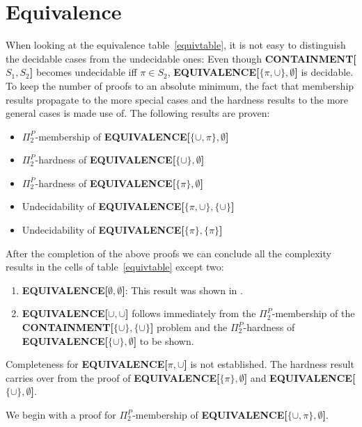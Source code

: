 \section{Equivalence}
When looking at the equivalence table~\ref{equivtable}, it is not easy to
distinguish the decidable cases from the undecidable ones: Even though
\textbf{CONTAINMENT[$S_1,S_2$]} becomes
undecidable iff $\pi \in S_2$, \textbf{EQUIVALENCE[$\{\pi,\cup\},\emptyset$]}
is decidable. To keep the number of proofs to an absolute minimum, the
fact that membership results propagate to the more special cases and the hardness
results to the more general cases is made use of.
The following results are proven:
\begin{itemize}
	\item $\Pi^P_2$-membership of \textbf{EQUIVALENCE[$\{\cup,\pi\},\emptyset$]}
	\item $\Pi^P_2$-hardness of \textbf{EQUIVALENCE[$\{\cup\},\emptyset$]}
	\item $\Pi^P_2$-hardness of \textbf{EQUIVALENCE[$\{\pi\},\emptyset$]}
	\item Undecidability of \textbf{EQUIVALENCE[$\{\pi,\cup \},\{\cup \}$]}
	\item Undecidability of \textbf{EQUIVALENCE[$\{\pi\},\{\pi\}$]}
\end{itemize}

After the completion of the above proofs we can conclude all the complexity results in the cells of table~\ref{equivtable}
except two:
\begin{enumerate}
	\item \textbf{EQUIVALENCE[$\emptyset,\emptyset$]}: This result was shown in
\cite{letelier2012static}. 
\item \textbf{EQUIVALENCE[$\cup,\cup$]} follows immediately from the $\Pi^P_2$-membership
	of the \textbf{CONTAINMENT[$\{\cup\}, \{\cup\}$]} problem and the $\Pi^P_2$-hardness of
	\textbf{EQUIVALENCE[$\{\cup\}, \emptyset$]} to be shown.
\end{enumerate}
Completeness for \textbf{EQUIVALENCE[$\pi,\cup$]} is not established. The hardness result
carries over from the proof of \textbf{EQUIVALENCE[$\{\pi\},\emptyset$]} and
\textbf{EQUIVALENCE[$\{\cup\},\emptyset$]}.

We begin with a proof for $\Pi^P_2$-membership of
\textbf{EQUIVALENCE[$\{\cup,\pi\},\emptyset$]}. 

